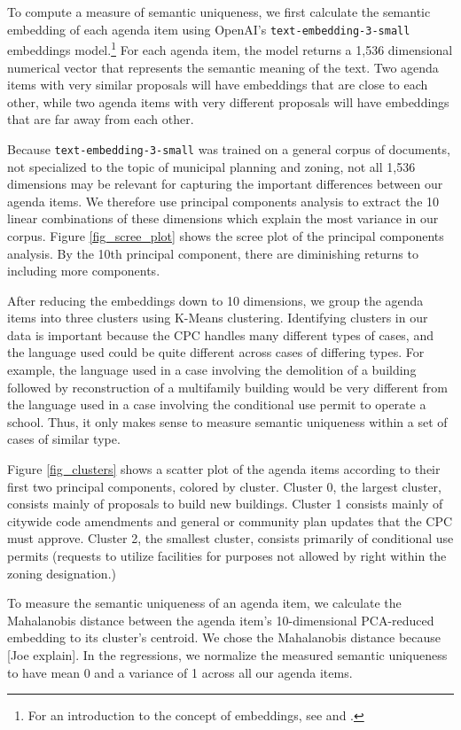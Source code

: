 To compute a measure of semantic uniqueness, we first calculate the semantic embedding of each agenda item using OpenAI's \texttt{text-embedding-3-small} embeddings model.\footnote{For an introduction to the concept of embeddings, see \citet{mikolov2013} and \citet{le2014}.} For each agenda item, the model returns a 1,536 dimensional numerical vector that represents the semantic meaning of the text. Two agenda items with very similar proposals will have embeddings that are close to each other, while two agenda items with very different proposals will have embeddings that are far away from each other. 

Because \texttt{text-embedding-3-small} was trained on a general corpus of documents, not specialized to the topic of municipal planning and zoning, not all 1,536 dimensions may be relevant for capturing the important differences between our agenda items. We therefore use principal components analysis to extract the 10 linear combinations of these dimensions which explain the most variance in our corpus. Figure \ref{fig_scree_plot} shows the scree plot of the principal components analysis. By the 10th principal component, there are diminishing returns to including more components.

After reducing the embeddings down to 10 dimensions, we group the agenda items into three clusters using K-Means clustering. Identifying clusters in our data is important because the CPC handles many different types of cases, and the language used could be quite different across cases of differing types. For example, the language used in a case involving the demolition of a building followed by reconstruction of a multifamily building would be very different from the language used in a case involving the conditional use permit to operate a school. Thus, it only makes sense to measure semantic uniqueness within a set of cases of similar type.

Figure \ref{fig_clusters} shows a scatter plot of the agenda items according to their first two principal components, colored by cluster. Cluster 0, the largest cluster, consists mainly of proposals to build new buildings. Cluster 1 consists mainly of citywide code amendments and general or community plan updates that the CPC must approve. Cluster 2, the smallest cluster, consists primarily of conditional use permits (requests to utilize facilities for purposes not allowed by right within the zoning designation.)

To measure the semantic uniqueness of an agenda item, we calculate the Mahalanobis distance between the agenda item's 10-dimensional PCA-reduced embedding to its cluster's centroid. We chose the Mahalanobis distance because [Joe explain]. In the regressions, we normalize the measured semantic uniqueness to have mean 0 and a variance of 1 across all our agenda items.

